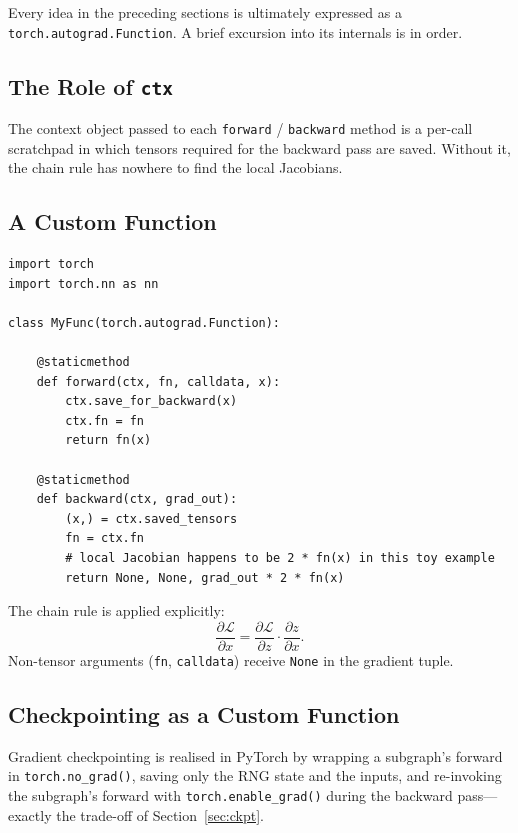 \documentclass[11pt,a4paper]{article}
\theoremstyle{definition}
\theoremstyle{remark}
\theoremstyle{plain}
\newcommand{\LL}{\mathcal{L}}
\begin{document}
Every idea in the preceding sections is ultimately expressed as a
\texttt{torch.autograd.Function}. A brief excursion into its internals is
in order.

\subsection{The Role of \texttt{ctx}}

The context object passed to each \texttt{forward} / \texttt{backward}
method is a per-call scratchpad in which tensors required for the
backward pass are saved. Without it, the chain rule has nowhere to find
the local Jacobians.

\subsection{A Custom Function}

\begin{lstlisting}
import torch
import torch.nn as nn

class MyFunc(torch.autograd.Function):

    @staticmethod
    def forward(ctx, fn, calldata, x):
        ctx.save_for_backward(x)
        ctx.fn = fn
        return fn(x)

    @staticmethod
    def backward(ctx, grad_out):
        (x,) = ctx.saved_tensors
        fn = ctx.fn
        # local Jacobian happens to be 2 * fn(x) in this toy example
        return None, None, grad_out * 2 * fn(x)
\end{lstlisting}

The chain rule is applied explicitly:
\begin{equation}
\frac{\partial \LL}{\partial x} =
\frac{\partial \LL}{\partial z} \cdot \frac{\partial z}{\partial x}.
\end{equation}
Non-tensor arguments (\texttt{fn}, \texttt{calldata}) receive
\texttt{None} in the gradient tuple.

\subsection{Checkpointing as a Custom Function}

Gradient checkpointing is realised in PyTorch by wrapping a subgraph's
forward in \verb|torch.no_grad()|, saving only the RNG state and the
inputs, and re-invoking the subgraph's forward with
\verb|torch.enable_grad()| during the backward pass---exactly the
trade-off of Section~\ref{sec:ckpt}.
\end{document}

